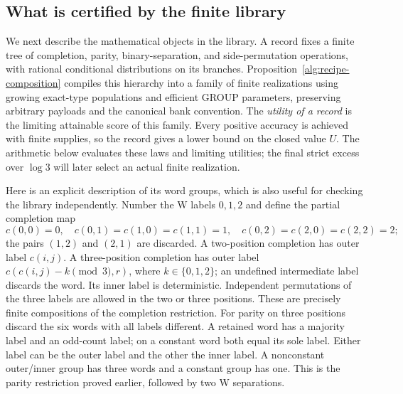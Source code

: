 \subsection{What is certified by the finite library}

We next describe the mathematical objects in the library.  A record fixes a
finite tree of completion, parity, binary-separation, and side-permutation
operations, with rational conditional distributions on its branches.
Proposition~\ref{alg:recipe-composition} compiles this hierarchy into a family
of finite realizations using growing exact-type populations and efficient
GROUP parameters,
preserving arbitrary payloads and the canonical bank convention.  The
\emph{utility of a record} is the limiting attainable score of this family.
Every positive accuracy is achieved with finite supplies, so the record
gives a lower bound on the closed value $U$.  The arithmetic below evaluates
these laws and limiting utilities; the final strict excess over $\log3$
will later select an actual finite realization.

Here is an explicit description of its word groups, which is also useful
for checking the library independently.  Number the W labels $0,1,2$ and
define the partial completion map
\[
 c(0,0)=0,\quad c(0,1)=c(1,0)=c(1,1)=1,\quad
 c(0,2)=c(2,0)=c(2,2)=2;
\]
the pairs $(1,2)$ and $(2,1)$ are discarded.  A two-position completion
has outer label $c(i,j)$.  A three-position completion has outer label
$c(c(i,j)-k\pmod3,r)$, where $k\in\{0,1,2\}$; an undefined intermediate
label discards the word.  Its inner label is deterministic.  Independent
permutations of the three labels are allowed in the two or three positions.
These are precisely finite compositions of the completion restriction.
For parity on three positions discard the six words with all labels
different.  A retained word has a majority label and an odd-count label;
on a constant word both equal its sole label.  Either label can be the
outer label and the other the inner label.  A nonconstant outer/inner
group has three words and a constant group has one.  This is the parity
restriction proved earlier, followed by two W separations.


